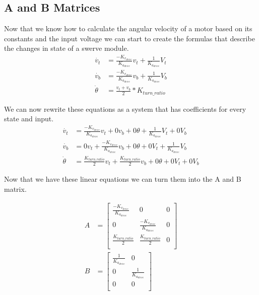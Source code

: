 \documentclass{scrartcl}
\begin{document}
\subsection{A and B Matrices}
Now that we know how to calculate the angular velocity of a motor based on its constants and the input voltage we can start to create the formulas that describe the changes in state of a swerve module.
\begin{align}
    \dot{v_t}    & = \frac{-K_{v_\mathit{drive}}}{K_{a_\mathit{drive}}}v_t + \frac{1}{K_{a_\mathit{drive}}}V_t \\
    \dot{v_b}    & = \frac{-K_{v_\mathit{drive}}}{K_{a_\mathit{drive}}}v_b + \frac{1}{K_{a_\mathit{drive}}}V_b \\
    \dot{\theta} & = \frac{v_t + v_b}{2} * K_\mathit{turn\_ratio}
\end{align}

We can now rewrite these equations as a system that has coefficients for every state and input.
\begin{align}
    \dot{v_t}    & = \frac{-K_{v_\mathit{drive}}}{K_{a_\mathit{drive}}}v_t + 0v_b + 0\theta + \frac{1}{K_{a_\mathit{drive}}}V_t + 0V_b \\
    \dot{v_b}    & = 0v_t + \frac{-K_{v_\mathit{drive}}}{K_{a_\mathit{drive}}}v_b + 0\theta + 0V_t + \frac{1}{K_{a_\mathit{drive}}}V_b \\
    \dot{\theta} & = \frac{K_\mathit{turn\_ratio}}{2}v_t + \frac{K_\mathit{turn\_ratio}}{2}v_b + 0\theta + 0V_t + 0V_b
\end{align}

Now that we have these linear equations we can turn them into the A and B matrix.

\begin{align}
    A & =
    \begin{bmatrix}
        \frac{-K_{v_\mathit{drive}}}{K_{a_\mathit{drive}}} & 0                                                  & 0 \\
        0                                                  & \frac{-K_{v_\mathit{drive}}}{K_{a_\mathit{drive}}} & 0 \\
        \frac{K_\mathit{turn\_ratio}}{2}                   & \frac{K_\mathit{turn\_ratio}}{2}                   & 0 \\
    \end{bmatrix} \\
    B & =
    \begin{bmatrix}
        \frac{1}{K_{a_\mathit{drive}}} & 0                              \\
        0                              & \frac{1}{K_{a_\mathit{drive}}} \\
        0                              & 0                              \\
    \end{bmatrix}
\end{align}
\end{document}
